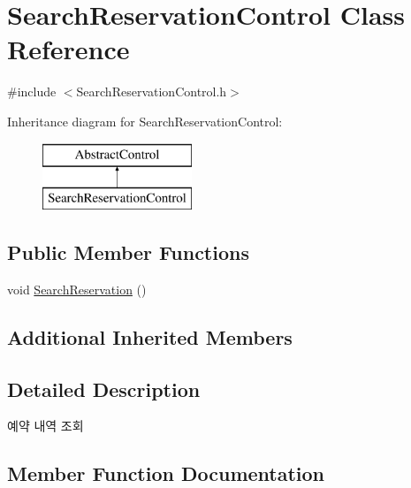 \hypertarget{class_search_reservation_control}{}\section{Search\+Reservation\+Control Class Reference}
\label{class_search_reservation_control}


{\ttfamily \#include $<$Search\+Reservation\+Control.\+h$>$}

Inheritance diagram for Search\+Reservation\+Control\+:\begin{figure}[H]
\begin{center}
\leavevmode
\includegraphics[height=2.000000cm]{class_search_reservation_control}
\end{center}
\end{figure}
\subsection*{Public Member Functions}
\begin{DoxyCompactItemize}
\item 
void \mbox{\hyperlink{class_search_reservation_control_abe42c4bf494cbafebad773f9b0737b98}{Search\+Reservation}} ()
\end{DoxyCompactItemize}
\subsection*{Additional Inherited Members}


\subsection{Detailed Description}
예약 내역 조회 

\subsection{Member Function Documentation}
\mbox{\label{class_search_reservation_control_abe42c4bf494cbafebad773f9b0737b98}} 
